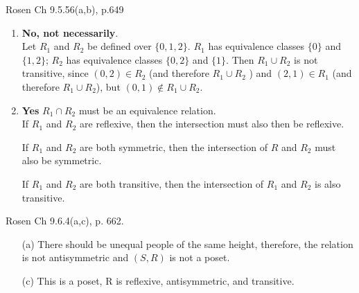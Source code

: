 \begin{questions}
    \ifprintanswers
        \vspace{-10pt}
    \fi
{} Rosen Ch 9.5.56(a,b), p.649
    \ifprintanswers
        \vspace{-15pt}
    \fi
    \begin{solution}
    	\begin{enumerate}[label=(\alph*),itemsep=1pt,topsep=0pt]
    		\item \textbf{No, not necessarily}. \\
    		Let $R_1$ and $R_2$ be defined over $\{0,1,2\}$. $R_1$ has equivalence classes $\{0\}$ and $\{1,2\}$; $R_2$ has equivalence classes $\{0,2\}$ and $\{1\}$. Then $R_1 \cup R_2$ is not transitive, since $(0, 2) \in R_2$ (and therefore $R_1 \cup R_2$ ) and $(2, 1) \in  R_1$ (and therefore $R_1 \cup R_2$), but $(0, 1) \not\in R_1 \cup R_2$.

    		\item \textbf{Yes} $R_1 \cap R_2$ must be an equivalence relation. \\
    		If $R_1$ and $R_2$ are reflexive, then the intersection must also then be reflexive. 

		    If $R_1$ and $R_2$ are both symmetric, then the intersection of $R$ and $R_2$ must also be symmetric.

		    If $R_1$ and $R_2$ are both transitive, then the intersection of $R_1$ and $R_2$ is also transitive.

    	\end{enumerate}
    \end{solution}


    \ifprintanswers
        \vspace{-10pt}
    \fi
{} Rosen Ch 9.6.4(a,c), p. 662.
    \ifprintanswers
        \vspace{-15pt}
    \fi
    \begin{solution}
    \begin{itemize}[itemsep=0pt,parsep=0pt,topsep=0pt,partopsep=0pt]
        \item[(a)] There should be unequal people of the same height, therefore, the relation is not antisymmetric and $(S, R)$ is not a poset.
        \item[(c)] This is a poset, R is reflexive, antisymmetric, and transitive.
    \end{itemize}
    \end{solution}






\end{questions}
